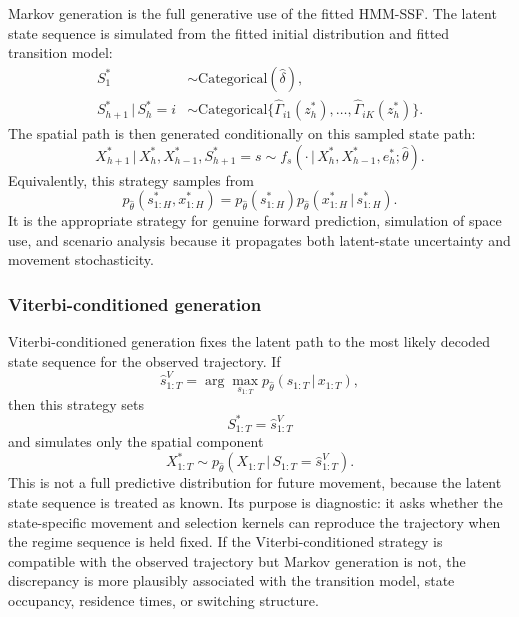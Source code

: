\documentclass[11pt]{article}
\newcommand{\given}{\,\vert\,}
\begin{document}
Markov generation is the full generative use of the fitted HMM-SSF. The latent
state sequence is simulated from the fitted initial distribution and fitted
transition model:
\begin{align*}
  S_1^{\ast}
  &\sim
  \mathrm{Categorical}(\hat{\delta}), \\
  S_{h+1}^{\ast}\given S_h^{\ast}=i
  &\sim
  \mathrm{Categorical}
  \{\hat{\Gamma}_{i1}(z_h^{\ast}),\ldots,\hat{\Gamma}_{iK}(z_h^{\ast})\}.
\end{align*}
The spatial path is then generated conditionally on this sampled state path:
\begin{equation*}
  X_{h+1}^{\ast}
  \given X_h^{\ast},X_{h-1}^{\ast},S_{h+1}^{\ast}=s
  \sim
  f_s(\cdot \given X_h^{\ast},X_{h-1}^{\ast},e_h^{\ast};\hat{\theta}).
\end{equation*}
Equivalently, this strategy samples from
\[
  p_{\hat{\theta}}(s_{1:H}^{\ast},x_{1:H}^{\ast})
  =
  p_{\hat{\theta}}(s_{1:H}^{\ast})
  p_{\hat{\theta}}(x_{1:H}^{\ast}\given s_{1:H}^{\ast}).
\]
It is the appropriate strategy for genuine forward prediction, simulation of
space use, and scenario analysis because it propagates both latent-state
uncertainty and movement stochasticity.

\subsubsection*{Viterbi-conditioned generation}

Viterbi-conditioned generation fixes the latent path to the most likely decoded
state sequence for the observed trajectory. If
\begin{equation*}
  \hat{s}_{1:T}^{V}
  =
  \arg\max_{s_{1:T}}
  p_{\hat{\theta}}(s_{1:T}\given x_{1:T}),
\end{equation*}
then this strategy sets
\begin{equation*}
  S_{1:T}^{\ast}=\hat{s}_{1:T}^{V}
\end{equation*}
and simulates only the spatial component
\begin{equation*}
  X_{1:T}^{\ast}
  \sim
  p_{\hat{\theta}}(X_{1:T}\given S_{1:T}=\hat{s}_{1:T}^{V}).
\end{equation*}
This is not a full predictive distribution for future movement, because the
latent state sequence is treated as known. Its purpose is diagnostic: it asks
whether the state-specific movement and selection kernels can reproduce the
trajectory when the regime sequence is held fixed. If the Viterbi-conditioned
strategy is compatible with the observed trajectory but Markov generation is
not, the discrepancy is more plausibly associated with the transition model,
state occupancy, residence times, or switching structure.
\end{document}
